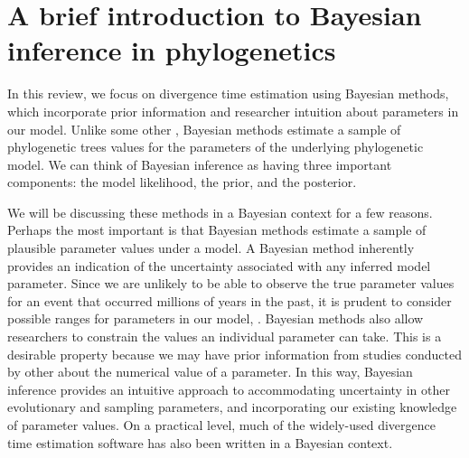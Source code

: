 
\section{A brief introduction to Bayesian inference in phylogenetics}


In this review, we focus on divergence time estimation using Bayesian methods, which incorporate prior information and researcher intuition about parameters in our model.
Unlike some other , Bayesian methods estimate a sample of phylogenetic trees  values for the parameters of the underlying phylogenetic model.
We can think of Bayesian inference as having three important components: the model likelihood, the prior, and the posterior.

We will be discussing these methods in a Bayesian context for a few reasons.
Perhaps the most important is that Bayesian methods estimate a sample of plausible parameter values under a model.
A Bayesian method inherently provides an indication of the uncertainty associated with any inferred model parameter.
Since we are unlikely to be able to observe the true parameter values for an event that occurred millions of years in the past, it is prudent to consider possible ranges for parameters in our model, .
Bayesian methods also allow researchers to constrain the values an individual parameter can take.
This is a desirable property because we may have prior information from studies conducted by other  about the numerical value of a parameter.
In this way, Bayesian inference provides an intuitive approach to accommodating uncertainty in other evolutionary and sampling parameters, and incorporating our existing knowledge of parameter values.
On a practical level, much of the widely-used divergence time estimation software has also been written in a Bayesian context.


